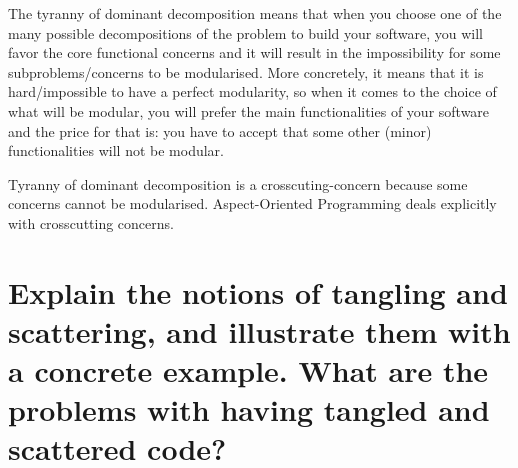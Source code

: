 \begin{solution}
The tyranny of dominant decomposition means that when you choose one of the
many possible decompositions of the problem to build your software, you will
favor the core functional concerns and it will result in the impossibility for
some subproblems/concerns to be modularised. More concretely, it means that it
is hard/impossible to have a perfect modularity, so when it comes to the choice
of what will be modular, you will prefer the main functionalities of your
software and the price for that is: you have to accept that some other (minor)
functionalities will not be modular.

Tyranny of dominant decomposition is a crosscuting-concern because some concerns cannot be modularised. Aspect-Oriented Programming deals explicitly with crosscutting concerns.
\end{solution}

\section{Explain the notions of tangling and scattering, and illustrate them with a concrete example.
What are the problems with having tangled and scattered code?}
\label{sec:scattering_tangling}

